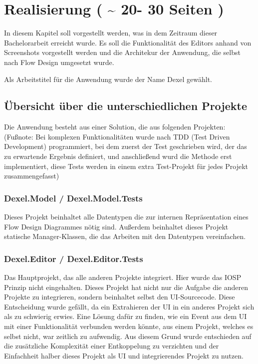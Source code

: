 \documentclass[11pt]{article}
\date{\today}
\title{}
\begin{document}
\tableofcontents

\section{Realisierung ( \textasciitilde{} 20- 30 Seiten )}
\label{sec:orgheadline48}
In diesem Kapitel soll vorgestellt werden, was in dem Zeitraum dieser
Bachelorarbeit erreicht wurde. Es soll die Funktionalität des Editors
anhand von Screenshots vorgestellt werden und die Architekur der Anwendung, die selbst nach
Flow Design umgesetzt wurde. 

Als Arbeitstitel für die Anwendung wurde der Name Dexel gewählt.

\subsection{Übersicht über die unterschiedlichen Projekte}
\label{sec:orgheadline5}

Die Anwendung besteht aus einer Solution, die aus folgenden Projekten:
(Fußnote: Bei komplexen Funktionalitäten wurde nach TDD (Test Driven Development)
programmiert, bei dem zuerst der Test geschrieben wird, der das zu erwartende
Ergebnis definiert, und anschließend wurd die Methode erst implementiert, diese
Tests werden in einem extra Test-Projekt für jedes Projekt zusammengefasst)

\subsubsection{Dexel.Model / Dexel.Model.Tests}
\label{sec:orgheadline1}
Dieses Projekt beinhaltet alle Datentypen die zur internen Repräsentation
eines Flow Design Diagrammes nötig sind. Außerdem beinhaltet dieses Projekt
statische Manager-Klassen, die das Arbeiten mit den Datentypen vereinfachen.

\subsubsection{Dexel.Editor / Dexel.Editor.Tests}
\label{sec:orgheadline2}
Das Hauptprojekt, das alle anderen Projekte integriert. Hier wurde das IOSP
Prinzip nicht eingehalten. Dieses Projekt hat nicht nur die Aufgabe die
anderen Projekte zu integrieren, sondern beinhaltet selbst den
UI-Sourcecode. Diese Entscheidung wurde gefällt, da ein Extrahieren der UI
in ein anderes Projekt sich als zu schwierig erwies. Eine Lösung dafür zu
finden, wie ein Event aus dem UI mit einer Funktionalität verbunden werden
könnte, aus einem Projekt, welches es selbst nicht, war zeitlich zu
aufwendig. Aus diesem Grund wurde entschieden auf die zusätzliche
Komplexität einer Entkoppelung zu verzichten und der Einfachheit halber
dieses Projekt als UI und integrierendes Projekt zu nutzen.
\end{document}
